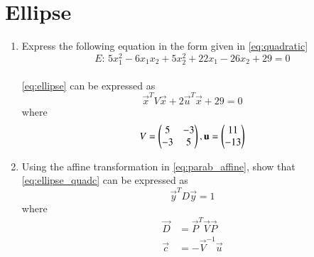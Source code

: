\documentclass[journal,12pt,twocolumn]{IEEEtran}
\renewcommand\thesection{\arabic{section}}
\begin{document}
\section{Ellipse}
\begin{enumerate}[label=\thesection.\arabic*
,ref=\thesection.\theenumi]
\item Express the following equation in the form given in \eqref{eq:quadratic}
\begin{equation}
E:\, 5x_1^2-6x_1x_2 + 5x_2^2+22x_1-26x_2+29=0
\label{eq:ellipse}
\end{equation}
\\
\solution \eqref{eq:ellipse} can be expressed as
\begin{equation}
\vec{x}^TV\vec{x} + 2\vec{u}^T\vec{x}  + 29=0
\label{eq:ellipse_quadc}
\end{equation}
%
where
\begin{equation}
V = \begin{pmatrix}5 & -3 \\ -3 & 5\end{pmatrix}, \mathbf{u} = \begin{pmatrix}11 \\ -13\end{pmatrix}
\label{eq:ellipsevu}
\end{equation}
%
\item Using the affine transformation in \eqref{eq:parab_affine}, show that 
\eqref{eq:ellipse_quadc} can be expressed as
\begin{equation}
\vec{y}^TD\vec{y}= 1
\label{eq:ellipseo}
\end{equation}
%
where
\begin{align}
\label{eq:ellipse_parmas_d}
\vec{D} &= 
\vec{P}^T\vec{V}\vec{P}
\\
\vec{c}&= -\vec{V}^{-1}\vec{u}

\end{align}
\end{enumerate}
\end{document}
